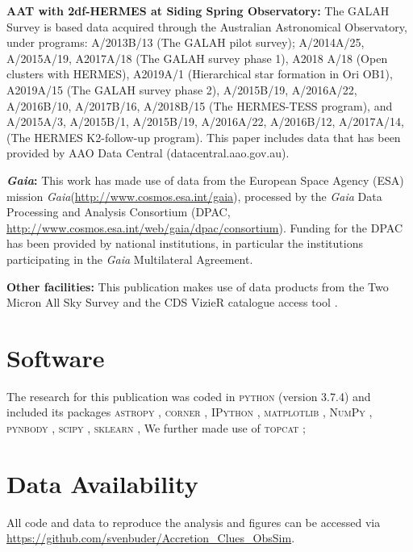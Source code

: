 \documentclass[fleqn,usenatbib]{mnras}
\newcommand{\Gaia}{\textit{Gaia}\xspace} %
\begin{document}
\textbf{AAT with 2df-HERMES at Siding Spring Observatory:}
The GALAH Survey is based data acquired through the Australian Astronomical Observatory, under programs: A/2013B/13 (The GALAH pilot survey); A/2014A/25, A/2015A/19, A2017A/18 (The GALAH survey phase 1), A2018 A/18 (Open clusters with HERMES), A2019A/1 (Hierarchical star formation in Ori OB1), A2019A/15 (The GALAH survey phase 2), A/2015B/19, A/2016A/22, A/2016B/10, A/2017B/16, A/2018B/15 (The HERMES-TESS program), and A/2015A/3, A/2015B/1, A/2015B/19, A/2016A/22, A/2016B/12, A/2017A/14, (The HERMES K2-follow-up program). This paper includes data that has been provided by AAO Data Central (datacentral.aao.gov.au).

\textbf{\Gaia: } This work has made use of data from the European Space Agency (ESA) mission \Gaia (\url{http://www.cosmos.esa.int/gaia}), processed by the \Gaia Data Processing and Analysis Consortium (DPAC, \url{http://www.cosmos.esa.int/web/gaia/dpac/consortium}). Funding for the DPAC has been provided by national institutions, in particular the institutions participating in the \Gaia Multilateral Agreement. 

\textbf{Other facilities:} This publication makes use of data products from the Two Micron All Sky Survey \citep{Skrutskie2006} and the CDS VizieR catalogue access tool \citep{Vizier2000}.

\section*{Software}

The research for this publication was coded in \textsc{python} (version 3.7.4) and included its packages
\textsc{astropy} \citep[v. 3.2.2;][]{Robitaille2013,PriceWhelan2018},
\textsc{corner} \citep[v. 2.0.1;][]{corner},
\textsc{IPython} \citep[v. 7.8.0;][]{ipython},
\textsc{matplotlib} \citep[v. 3.1.3;][]{matplotlib},
\textsc{NumPy} \citep[v. 1.17.2;][]{numpy},
\textsc{pynbody} \citep[v. 1.1.0;][]{pynbody},
\textsc{scipy} \citep[version 1.3.1;][]{scipy},
\textsc{sklearn} \citep[v. 0.21.3;][]{scikit-learn},
We further made use of \textsc{topcat} \citep[version 4.7;][]{Taylor2005};

\section*{Data Availability}

All code and data to reproduce the analysis and figures can be accessed via \url{https://github.com/svenbuder/Accretion_Clues_ObsSim}.
\end{document}
